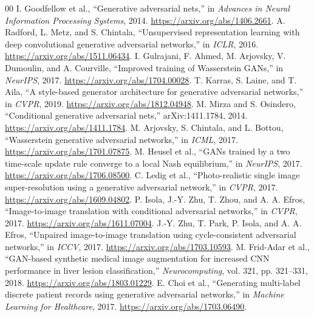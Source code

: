 \documentclass[conference]{IEEEtran}
\begin{document}
\begingroup\fontsize{7}{7.5}\selectfont
\begin{thebibliography}{00}
 I. Goodfellow et al., ``Generative adversarial nets,'' in \emph{Advances in Neural Information Processing Systems}, 2014. \url{https://arxiv.org/abs/1406.2661}.
 A. Radford, L. Metz, and S. Chintala, ``Unsupervised representation learning with deep convolutional generative adversarial networks,'' in \emph{ICLR}, 2016. \url{https://arxiv.org/abs/1511.06434}.
 I. Gulrajani, F. Ahmed, M. Arjovsky, V. Dumoulin, and A. Courville, ``Improved training of Wasserstein GANs,'' in \emph{NeurIPS}, 2017. \url{https://arxiv.org/abs/1704.00028}.
 T. Karras, S. Laine, and T. Aila, ``A style-based generator architecture for generative adversarial networks,'' in \emph{CVPR}, 2019. \url{https://arxiv.org/abs/1812.04948}.
 M. Mirza and S. Osindero, ``Conditional generative adversarial nets,'' arXiv:1411.1784, 2014. \url{https://arxiv.org/abs/1411.1784}.
 M. Arjovsky, S. Chintala, and L. Bottou, ``Wasserstein generative adversarial networks,'' in \emph{ICML}, 2017. \url{https://arxiv.org/abs/1701.07875}.
 M. Heusel et al., ``GANs trained by a two time-scale update rule converge to a local Nash equilibrium,'' in \emph{NeurIPS}, 2017. \url{https://arxiv.org/abs/1706.08500}.
 C. Ledig et al., ``Photo-realistic single image super-resolution using a generative adversarial network,'' in \emph{CVPR}, 2017. \url{https://arxiv.org/abs/1609.04802}.
 P. Isola, J.-Y. Zhu, T. Zhou, and A. A. Efros, ``Image-to-image translation with conditional adversarial networks,'' in \emph{CVPR}, 2017. \url{https://arxiv.org/abs/1611.07004}.
 J.-Y. Zhu, T. Park, P. Isola, and A. A. Efros, ``Unpaired image-to-image translation using cycle-consistent adversarial networks,'' in \emph{ICCV}, 2017. \url{https://arxiv.org/abs/1703.10593}.
 M. Frid-Adar et al., ``GAN-based synthetic medical image augmentation for increased CNN performance in liver lesion classification,'' \emph{Neurocomputing}, vol. 321, pp. 321--331, 2018. \url{https://arxiv.org/abs/1803.01229}.
 E. Choi et al., ``Generating multi-label discrete patient records using generative adversarial networks,'' in \emph{Machine Learning for Healthcare}, 2017. \url{https://arxiv.org/abs/1703.06490}.
\end{thebibliography}\endgroup
\end{document}

